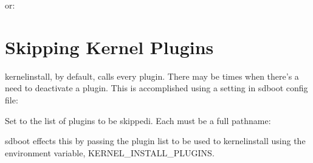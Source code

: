 \documentclass[letterpaper,11pt,english]{sphinxmanual}
\begin{document}
\sphinxAtStartPar
or:

\begin{sphinxVerbatim}[commandchars=\\\{\}]
 
\end{sphinxVerbatim}

\sphinxstepscope


\chapter{Skipping Kernel Plugins}
\label{\detokenize{Skipping-Kernel-Plugins:skipping-kernel-plugins}}\label{\detokenize{Skipping-Kernel-Plugins::doc}}
\sphinxAtStartPar
kernel\sphinxhyphen{}install, by default, calls every plugin.
There may be times when there’s a need to de\sphinxhyphen{}activate a plugin. This is accomplished using
a setting in sd\sphinxhyphen{}boot config file:

\begin{sphinxVerbatim}[commandchars=\\\{\}]
\end{sphinxVerbatim}

\sphinxAtStartPar
Set  to  the list of plugins to be skippedi.
Each must be a full pathname:

\begin{sphinxVerbatim}[commandchars=\\\{\}]
     
     
\end{sphinxVerbatim}

\sphinxAtStartPar
sd\sphinxhyphen{}boot effects this by passing the plugin list to be used to kernel\sphinxhyphen{}install using the environment variable,
KERNEL\_INSTALL\_PLUGINS.
\end{document}
